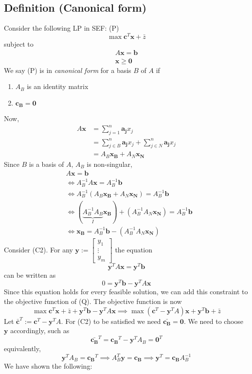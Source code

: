 \subsection{Definition (Canonical form)}
Consider the following LP in SEF: (P)
\[\max \mathbf{c}^T \mathbf{x}+\bar{z}\]
subject to
\begin{align*}
    A\mathbf{x}=\mathbf{b}\\
    \mathbf{x}\ge \mathbf{0}
\end{align*}
We say (P) is in \emph{canonical form} for a basis $B$ of $A$ if
\begin{enumerate}[(C1)]
    \item $A_B$ is an identity matrix
    \item $\mathbf{c_B}=\mathbf{0}$
\end{enumerate}
Now,
\begin{align*}
    A\mathbf{x}
    &=\sum_{j = 1}^{n}\mathbf{a_j}x_j\\
    &=\sum_{j\in B}^{n}\mathbf{a_j}x_j+\sum_{j\in N}^{n}\mathbf{a_j}x_j\\
    &=A_B \mathbf{x_B}+A_N \mathbf{x_N}
\end{align*}
Since $B$ is a basis of $A$, $A_B$ is non-singular,
\begin{align*}
    &A\mathbf{x}=\mathbf{b}\\
    &\iff
    A_B^{-1}A\mathbf{x}=A_B^{-1}\mathbf{b}\\
    &\iff
    A_B^{-1}(A_B\mathbf{x_B}+A_N\mathbf{x_N})=A_B^{-1}\mathbf{b}\\
    &\iff
    (\underbrace{A_B^{-1} A_B}_{I}\mathbf{x_B})+
    (A_B^{-1} A_N\mathbf{x_N})=A_B^{-1}\mathbf{b}\\
    &\iff
    \mathbf{x_B}=A_B^{-1}\mathbf{b}-(A_B^{-1} A_N\mathbf{x_N})
\end{align*}
Consider (C2). For any $\mathbf{y}:=\begin{bmatrix}
    y_1\\
    \vdots\\
    y_m
\end{bmatrix}$
the equation
\[\mathbf{y}^TA\mathbf{x}=\mathbf{y}^T\mathbf{b}\]
can be written as
\[0=\mathbf{y}^T\mathbf{b}-\mathbf{y}^TA\mathbf{x}\]
Since  this  equation  holds  for  every  feasible  solution,  we  can  add  this 
constraint to the objective function of (Q). The objective function is now
\[\max \mathbf{c}^T \mathbf{x}+\bar{z}+\mathbf{y}^T\mathbf{b}-\mathbf{y}^TA\mathbf{x}
\implies
\max (\mathbf{c}^T-\mathbf{y}^TA)\mathbf{x}+\mathbf{y}^T\mathbf{b}+\bar{z}\]
Let $\mathbf{\bar{c}}^T:=\mathbf{c}^T-\mathbf{y}^TA$. For (C2) to be satisfied we need
$\mathbf{\bar{c_B}}=\mathbf{0}$. We need to choose $\mathbf{y}$ accordingly, such as
\[\mathbf{\bar{c_B}}^T=\mathbf{c_B}^T-\mathbf{y}^TA_B=\mathbf{0}^T\]
equivalently,
\[\mathbf{y}^TA_B=\mathbf{c_B}^T
\implies
A_B^T\mathbf{y}=\mathbf{c_B}
\implies
\mathbf{y}^T=\mathbf{c_B}A_B^{-1}\]
We have shown the following:

